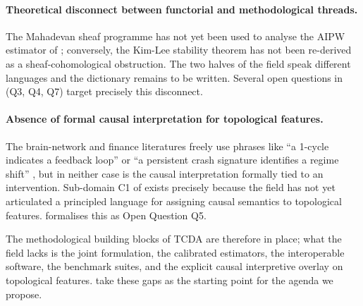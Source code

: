 \paragraph{Theoretical disconnect between functorial and methodological threads.}
The Mahadevan sheaf programme \citep{mahadevan2021causal,
mahadevan2022universal,mahadevan2025sheaf} has not yet been used to
analyse the AIPW estimator of \citet{kim2026topological}; conversely,
the Kim-Lee stability theorem has not been re-derived as a
sheaf-cohomological obstruction. The two halves of the field speak
different languages and the dictionary remains to be written. Several
open questions in  (Q3, Q4, Q7) target precisely
this disconnect.

\paragraph{Absence of formal causal interpretation for topological features.}
The brain-network and finance literatures freely use phrases like
``a 1-cycle indicates a feedback loop'' \citep{sizemore2018cliques,
elyaagoubi2023statistical} or ``a persistent crash signature
identifies a regime shift'' \citep{gidea2018topological,
ismail2022early}, but in neither case is the causal interpretation
formally tied to an intervention. Sub-domain C1 of 
exists precisely because the field has not yet articulated a principled
language for assigning causal semantics to topological features.
 formalises this as Open Question Q5.

\medskip
The methodological building blocks of TCDA are therefore in place; what
the field lacks is the joint formulation, the calibrated estimators,
the interoperable software, the benchmark suites, and the explicit
causal interpretive overlay on topological features.
 take these gaps as the starting
point for the agenda we propose.
